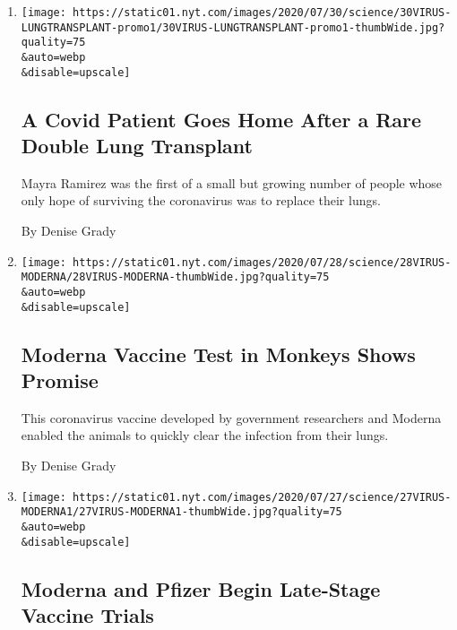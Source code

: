 \begin{enumerate}
\def\labelenumi{\arabic{enumi}.}
\item
  \href{/2020/07/30/health/Covid-lung-transplant.html}{}

  \texttt{[image: https://static01.nyt.com/images/2020/07/30/science/30VIRUS-LUNGTRANSPLANT-promo1/30VIRUS-LUNGTRANSPLANT-promo1-thumbWide.jpg?quality=75\\\&auto=webp\\\&disable=upscale]}

  \hypertarget{a-covid-patient-goes-home-after-a-rare-double-lung-transplant}{%
  \subsection{A Covid Patient Goes Home After a Rare Double Lung
  Transplant}\label{a-covid-patient-goes-home-after-a-rare-double-lung-transplant}}

  Mayra Ramirez was the first of a small but growing number of people
  whose only hope of surviving the coronavirus was to replace their
  lungs.

  By Denise Grady
\item
  \href{/2020/07/28/health/coronavirus-moderna-vaccine-monkeys.html}{}

  \texttt{[image: https://static01.nyt.com/images/2020/07/28/science/28VIRUS-MODERNA/28VIRUS-MODERNA-thumbWide.jpg?quality=75\\\&auto=webp\\\&disable=upscale]}

  \hypertarget{moderna-vaccine-test-in-monkeys-shows-promise}{%
  \subsection{Moderna Vaccine Test in Monkeys Shows
  Promise}\label{moderna-vaccine-test-in-monkeys-shows-promise}}

  This coronavirus vaccine developed by government researchers and
  Moderna enabled the animals to quickly clear the infection from their
  lungs.

  By Denise Grady
\item
  \href{/2020/07/27/health/moderna-vaccine-covid.html}{}

  \texttt{[image: https://static01.nyt.com/images/2020/07/27/science/27VIRUS-MODERNA1/27VIRUS-MODERNA1-thumbWide.jpg?quality=75\\\&auto=webp\\\&disable=upscale]}

  \hypertarget{moderna-and-pfizer-begin-late-stage-vaccine-trials}{%
  \subsection{Moderna and Pfizer Begin Late-Stage Vaccine
  Trials}\label{moderna-and-pfizer-begin-late-stage-vaccine-trials}}


\end{enumerate}

